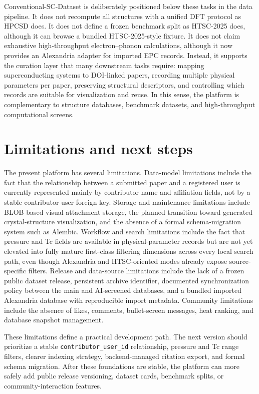 \documentclass[11pt,a4paper]{article}
\begin{document}
Conventional-SC-Dataset is deliberately positioned below these tasks in the data pipeline. It does not recompute all structures with a unified DFT protocol as HPCSD does. It does not define a frozen benchmark split as HTSC-2025 does, although it can browse a bundled HTSC-2025-style fixture. It does not claim exhaustive high-throughput electron--phonon calculations, although it now provides an Alexandria adapter for imported EPC records. Instead, it supports the curation layer that many downstream tasks require: mapping superconducting systems to DOI-linked papers, recording multiple physical parameters per paper, preserving structural descriptors, and controlling which records are suitable for visualization and reuse. In this sense, the platform is complementary to structure databases, benchmark datasets, and high-throughput computational screens.

\section{Limitations and next steps}

The present platform has several limitations. Data-model limitations include the fact that the relationship between a submitted paper and a registered user is currently represented mainly by contributor name and affiliation fields, not by a stable contributor-user foreign key. Storage and maintenance limitations include BLOB-based visual-attachment storage, the planned transition toward generated crystal-structure visualization, and the absence of a formal schema-migration system such as Alembic. Workflow and search limitations include the fact that pressure and Tc fields are available in physical-parameter records but are not yet elevated into fully mature first-class filtering dimensions across every local search path, even though Alexandria and HTSC-oriented modes already expose source-specific filters. Release and data-source limitations include the lack of a frozen public dataset release, persistent archive identifier, documented synchronization policy between the main and AI-screened databases, and a bundled imported Alexandria database with reproducible import metadata. Community limitations include the absence of likes, comments, bullet-screen messages, heat ranking, and database snapshot management.

These limitations define a practical development path. The next version should prioritize a stable \texttt{contributor\_user\_id} relationship, pressure and Tc range filters, clearer indexing strategy, backend-managed citation export, and formal schema migration. After these foundations are stable, the platform can more safely add public release versioning, dataset cards, benchmark splits, or community-interaction features.
\end{document}
